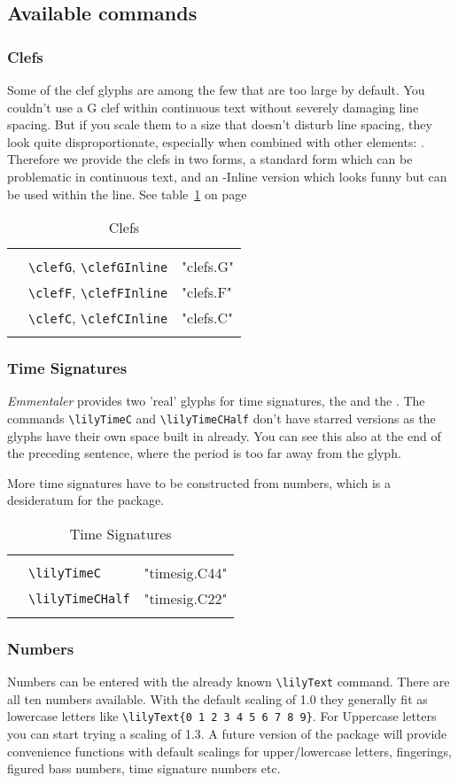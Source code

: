 \documentclass{article}
\newcommand*{\cmd}[1]{\texttt{\textbackslash #1}}
\newcommand{\tmpCaption}{} %
\newcommand{\tmpLabel}{}
\newenvironment{reftable}[2]
	{%
		\renewcommand{\tmpCaption}{#1}
		\renewcommand{\tmpLabel}{#2}
		\begin{table}[ht]
		\begin{center}
		\begin{tabular}[t]{lll}
		\hline
		&\\
	}
	{%
		&\\
		\hline
		\end{tabular}
		\caption{\tmpCaption}
		\label{table:\tmpLabel}
		\end{center}
		\end{table}
	}
\begin{document}
\subsection{Available commands}

\subsubsection{Clefs}
Some of the clef glyphs are among the few that are too large by default. You couldn't use a G clef within continuous text without severely \clefG damaging	 line spacing. But if you scale them to a size that doesn't disturb line spacing, they look quite disproportionate, especially when combined with other elements: \clefCInline \natural. Therefore we provide the clefs in two forms, a standard form which can be problematic in continuous text, and an -Inline version which looks funny but can be used within the line. See table~\ref{table:clefs} on page~\pageref{table:clefs}

\begin{reftable}{Clefs}{clefs}
\clefGInline & \cmd{clefG}, \cmd{clefGInline} & "clefs.G"\\
\clefFInline & \cmd{clefF}, \cmd{clefFInline} & "clefs.F"\\
\clefCInline & \cmd{clefC}, \cmd{clefCInline} & "clefs.C"\\
\end{reftable}

\subsubsection{Time Signatures}
\emph{Emmentaler} provides two 'real' glyphs for time signatures, the \lilyTimeC and the \lilyTimeCHalf. The commands \cmd{lilyTimeC} and \cmd{lilyTimeCHalf} don't have starred versions as the glyphs have their own space built in already. You can see this also at the end of the preceding sentence, where the period is too far away from the glyph.

More time signatures have to be constructed from numbers, which is a desideratum for the package.

\begin{reftable}{Time Signatures}{timesignatures}
\lilyTimeC & \cmd{lilyTimeC} & "timesig.C44"\\
\lilyTimeCHalf & \cmd{lilyTimeCHalf} & "timesig.C22"\\
\end{reftable}


\subsubsection{Numbers}
Numbers can be entered with the already known \cmd{lilyText} command. There are all ten numbers available. With the default scaling of 1.0 they generally fit as lowercase letters like  \cmd{lilyText\{0 1 2 3 4 5 6 7 8 9\}}. For Uppercase letters you can start trying a scaling of 1.3. A future version of the package will provide convenience functions with default scalings for upper/lowercase letters, fingerings, figured bass numbers, time signature numbers etc.
\end{document}
